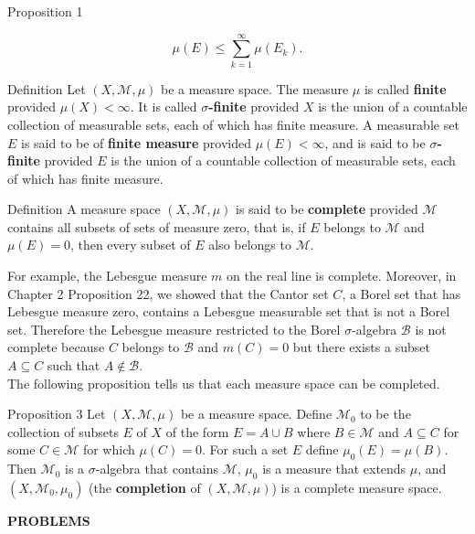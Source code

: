 \begin{flushleft}
\begin{namedthm*}{Proposition 1}
\begin{enumerate}[\indent {}]
			\[
				\mu(E)\le\sum_{k=1}^\infty\mu(E_k).	
			\]
		\end{enumerate}
	\end{namedthm*}
	\begin{namedthm*}{Definition}
		Let $(X,\mathcal{M},\mu)$ be a measure space. 
		The measure $\mu$ is called \textbf{finite} provided $\mu(X)<\infty$. 
		It is called \textbf{$\sigma$-finite} provided $X$ is the union of a countable collection of measurable sets, each of which has finite measure.
		A measurable set $E$ is said to be of \textbf{finite measure} provided $\mu(E)<\infty$, and is said to be \textbf{$\sigma$-finite} provided $E$ is the union of a countable collection of measurable sets, each of which has finite measure.
	\end{namedthm*}
	\begin{namedthm*}{Definition}
		A measure space $(X,\mathcal{M},\mu)$ is said to be \textbf{complete} provided $\mathcal{M}$ contains all subsets of sets of measure zero, that is, if $E$ belongs to $\mathcal{M}$ and $\mu(E)=0$, then every subset of $E$ also belongs to $\mathcal{M}$.
	\end{namedthm*}
	For example, the Lebesgue measure $m$ on the real line is complete. 
	Moreover, in Chapter 2 Proposition 22, we showed that the Cantor set $C$, a Borel set that has Lebesgue measure zero, contains a Lebesgue measurable set that is not a Borel set.
	Therefore the Lebesgue measure restricted to the Borel $\sigma$-algebra $\mathcal{B}$ is not complete because $C$ belongs to $\mathcal{B}$ and $m(C)=0$ but there exists a subset $A\subseteq C$ such that $A\notin\mathcal{B}$.\\
	\medskip
	The following proposition tells us that each measure space can be completed.
	\begin{namedthm*}{Proposition 3}
		Let $(X,\mathcal{M},\mu)$ be a measure space.
		Define $\mathcal{M}_0$ to be the collection of subsets $E$ of $X$ of the form $E=A\cup B$ where $B\in\mathcal{M}$ and $A\subseteq C$ for some $C\in\mathcal{M}$ for which $\mu(C)=0$.
		For such a set $E$ define $\mu_0(E)=\mu(B)$. 
		Then $\mathcal{M}_0$ is a $\sigma$-algebra that contains $\mathcal{M}$, $\mu_0$ is a measure that extends $\mu$, and $(X,\mathcal{M}_0,\mu_0)$ (the \textbf{completion} of $(X,\mathcal{M},\mu)$) is a complete measure space.
	\end{namedthm*}
\end{flushleft}
\begin{center}
	\textbf{PROBLEMS}
\end{center}
